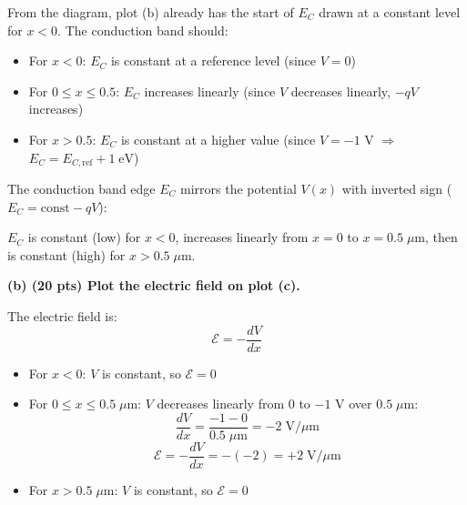 \documentclass[11pt]{article}
\begin{document}
From the diagram, plot (b) already has the start of $E_C$ drawn at a constant level for $x < 0$. The conduction band should:
\begin{itemize}[nosep]
  \item For $x < 0$: $E_C$ is constant at a reference level (since $V = 0$)
  \item For $0 \le x \le 0.5$: $E_C$ increases linearly (since $V$ decreases linearly, $-qV$ increases)
  \item For $x > 0.5$: $E_C$ is constant at a higher value (since $V = -1$ V $\Rightarrow$ $E_C = E_{C,\text{ref}} + 1\;\text{eV}$)
\end{itemize}

\begin{answerbox}
  The conduction band edge $E_C$ mirrors the potential $V(x)$ with inverted sign ($E_C = \text{const} - qV$):

  \begin{center}
  \end{center}

  $E_C$ is constant (low) for $x < 0$, increases linearly from $x = 0$ to $x = 0.5\;\mu$m, then is constant (high) for $x > 0.5\;\mu$m.
\end{answerbox}

\textbf{(b) (20 pts) Plot the electric field on plot (c).}

The electric field is:
\[
  \mathcal{E} = -\frac{dV}{dx}
\]
\begin{itemize}[nosep]
  \item For $x < 0$: $V$ is constant, so $\mathcal{E} = 0$
  \item For $0 \le x \le 0.5\;\mu\text{m}$: $V$ decreases linearly from $0$ to $-1$ V over $0.5\;\mu\text{m}$:
    \[
      \frac{dV}{dx} = \frac{-1 - 0}{0.5\;\mu\text{m}} = -2\;\text{V}/\mu\text{m}
    \]
    \[
      \mathcal{E} = -\frac{dV}{dx} = -(-2) = +2\;\text{V}/\mu\text{m}
    \]
  \item For $x > 0.5\;\mu\text{m}$: $V$ is constant, so $\mathcal{E} = 0$
\end{itemize}
\end{document}

